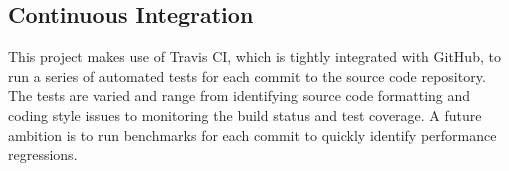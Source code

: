 
\subsection{Continuous Integration}
\label{sec:continuous_integration}

This project makes use of Travis CI, which is tightly integrated with GitHub, to run a series of automated tests for each commit to the source code repository. The tests are varied and range from identifying source code formatting and coding style issues to monitoring the build status and test coverage. A future ambition is to run benchmarks for each commit to quickly identify performance regressions.








